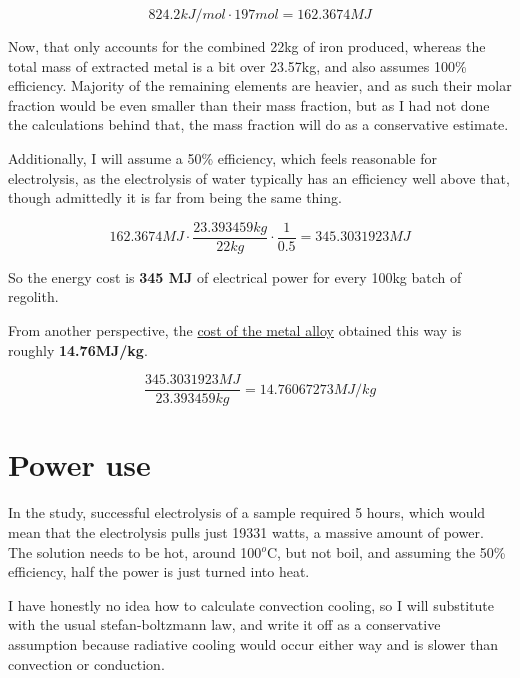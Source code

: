 \documentclass[a4paper]{article}
\begin{document}
    $$ 824.2 kJ/mol \cdot 197mol = 162.3674MJ $$
    
    Now, that only accounts for the combined 22kg of iron produced, whereas the total mass of extracted metal is a bit over 23.57kg, and also assumes 100\% efficiency.
    Majority of the remaining elements are heavier, and as such their molar fraction would be even smaller than their mass fraction, but as I had not done the calculations behind that, the mass fraction will do as a conservative estimate.
    
    \medskip
    
    Additionally, I will assume a 50\% efficiency, which feels reasonable for electrolysis, as the electrolysis of water typically has an efficiency well above that, though admittedly it is far from being the same thing.
    
    $$ 162.3674MJ \cdot \frac{23.393459 kg}{22kg} \cdot \frac{1}{0.5} = 345.3031923 MJ $$
    
    So the energy cost is \textbf{345 MJ} of electrical power for every 100kg batch of regolith.
    
    \medskip
    
    \noindent From another perspective, the \underline{cost of the metal alloy} obtained this way is roughly \textbf{14.76MJ/kg}.
    
    $$ \frac{345.3031923 MJ}{23.393459 kg} = 14.76067273 MJ/kg $$
    
    
    
    
    \pagebreak
    
    \section{Power use}
    
    In the study, successful electrolysis of a sample required 5 hours, which would mean that the electrolysis pulls just 19331 watts, a massive amount of power.
    The solution needs to be hot, around 100$^o$C, but not boil, and assuming the 50\% efficiency, half the power is just turned into heat.
    
    \medskip
    
    I have honestly no idea how to calculate convection cooling, so I will substitute with the usual stefan-boltzmann law, and write it off as a conservative assumption because radiative cooling would occur either way and is slower than convection or conduction.
    
\end{document}
